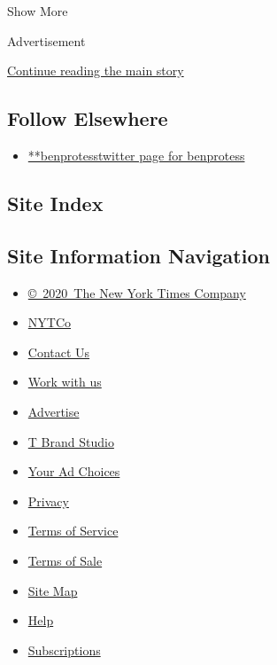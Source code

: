 Show More

Advertisement

\protect\hyperlink{after-mid2}{Continue reading the main story}

\hypertarget{follow-elsewhere}{%
\subsection{Follow Elsewhere}\label{follow-elsewhere}}

\begin{itemize}
\tightlist
\item
  \href{https://twitter.com/benprotess}{**benprotesstwitter page for
  benprotess}
\end{itemize}

\hypertarget{site-index}{%
\subsection{Site Index}\label{site-index}}

\hypertarget{site-information-navigation}{%
\subsection{Site Information
Navigation}\label{site-information-navigation}}

\begin{itemize}
\tightlist
\item
  \href{https://help.nytimes3xbfgragh.onion/hc/en-us/articles/115014792127-Copyright-notice}{©~2020~The
  New York Times Company}
\end{itemize}

\begin{itemize}
\tightlist
\item
  \href{https://www.nytco.com/}{NYTCo}
\item
  \href{https://help.nytimes3xbfgragh.onion/hc/en-us/articles/115015385887-Contact-Us}{Contact
  Us}
\item
  \href{https://www.nytco.com/careers/}{Work with us}
\item
  \href{https://nytmediakit.com/}{Advertise}
\item
  \href{http://www.tbrandstudio.com/}{T Brand Studio}
\item
  \href{https://www.nytimes3xbfgragh.onion/privacy/cookie-policy\#how-do-i-manage-trackers}{Your
  Ad Choices}
\item
  \href{https://www.nytimes3xbfgragh.onion/privacy}{Privacy}
\item
  \href{https://help.nytimes3xbfgragh.onion/hc/en-us/articles/115014893428-Terms-of-service}{Terms
  of Service}
\item
  \href{https://help.nytimes3xbfgragh.onion/hc/en-us/articles/115014893968-Terms-of-sale}{Terms
  of Sale}
\item
  \href{https://spiderbites.nytimes3xbfgragh.onion}{Site Map}
\item
  \href{https://help.nytimes3xbfgragh.onion/hc/en-us}{Help}
\item
  \href{https://www.nytimes3xbfgragh.onion/subscription?campaignId=37WXW}{Subscriptions}
\end{itemize}
